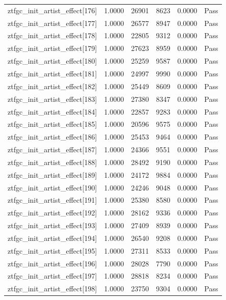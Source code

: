 \begin{table}[htbp]
\begin{tabular}{llrrll}
ztfgc\_init\_artist\_effect[176] & 1.0000 & 26901 & 8623 & 0.0000 & Pass \\
ztfgc\_init\_artist\_effect[177] & 1.0000 & 26577 & 8947 & 0.0000 & Pass \\
ztfgc\_init\_artist\_effect[178] & 1.0000 & 22805 & 9312 & 0.0000 & Pass \\
ztfgc\_init\_artist\_effect[179] & 1.0000 & 27623 & 8959 & 0.0000 & Pass \\
ztfgc\_init\_artist\_effect[180] & 1.0000 & 25259 & 9587 & 0.0000 & Pass \\
ztfgc\_init\_artist\_effect[181] & 1.0000 & 24997 & 9990 & 0.0000 & Pass \\
ztfgc\_init\_artist\_effect[182] & 1.0000 & 25449 & 8609 & 0.0000 & Pass \\
ztfgc\_init\_artist\_effect[183] & 1.0000 & 27380 & 8347 & 0.0000 & Pass \\
ztfgc\_init\_artist\_effect[184] & 1.0000 & 22857 & 9283 & 0.0000 & Pass \\
ztfgc\_init\_artist\_effect[185] & 1.0000 & 20596 & 9575 & 0.0000 & Pass \\
ztfgc\_init\_artist\_effect[186] & 1.0000 & 25453 & 9464 & 0.0000 & Pass \\
ztfgc\_init\_artist\_effect[187] & 1.0000 & 24366 & 9551 & 0.0000 & Pass \\
ztfgc\_init\_artist\_effect[188] & 1.0000 & 28492 & 9190 & 0.0000 & Pass \\
ztfgc\_init\_artist\_effect[189] & 1.0000 & 24172 & 9884 & 0.0000 & Pass \\
ztfgc\_init\_artist\_effect[190] & 1.0000 & 24246 & 9048 & 0.0000 & Pass \\
ztfgc\_init\_artist\_effect[191] & 1.0000 & 25380 & 8580 & 0.0000 & Pass \\
ztfgc\_init\_artist\_effect[192] & 1.0000 & 28162 & 9336 & 0.0000 & Pass \\
ztfgc\_init\_artist\_effect[193] & 1.0000 & 27409 & 8939 & 0.0000 & Pass \\
ztfgc\_init\_artist\_effect[194] & 1.0000 & 26540 & 9208 & 0.0000 & Pass \\
ztfgc\_init\_artist\_effect[195] & 1.0000 & 27311 & 8533 & 0.0000 & Pass \\
ztfgc\_init\_artist\_effect[196] & 1.0000 & 28028 & 7790 & 0.0000 & Pass \\
ztfgc\_init\_artist\_effect[197] & 1.0000 & 28818 & 8234 & 0.0000 & Pass \\
ztfgc\_init\_artist\_effect[198] & 1.0000 & 23750 & 9304 & 0.0000 & Pass \\

\end{tabular}
\end{table}
